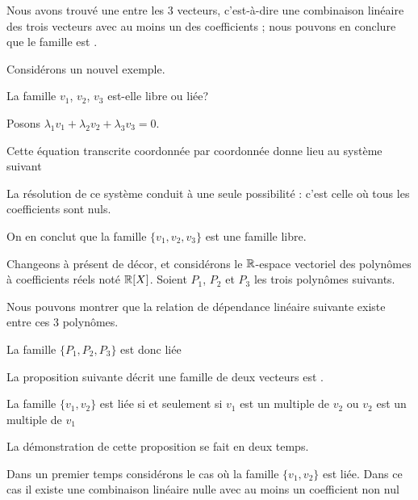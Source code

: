 \change
Nous avons trouvé une  entre les 3 vecteurs,
c'est-à-dire une combinaison linéaire  des trois vecteurs 
avec au moins un des coefficients  ;
nous pouvons en conclure que le famille est .


\diapo
Considérons un nouvel exemple.

\change
La famille $v_1$, $v_2$, $v_3$ est-elle libre ou liée?

\change
 Posons
$\lambda_1 v_1+ \lambda_2 v_2 + \lambda_3 v_3 = 0$.

\change
Cette équation transcrite coordonnée par coordonnée donne lieu au syst\`eme suivant

\change
La résolution de ce syst\`eme conduit à une seule possibilité : c'est celle où tous les coefficients sont nuls.

\change 
On en conclut que la famille $\{v_1, v_2, v_3\}$ est une famille libre.

% 
% 
% 



\diapo
Changeons à présent de décor, et considérons le $\mathbb{R}$-espace vectoriel des polynômes à coefficients réels noté $\mathbb{R}[X]$. Soient $P_1$, $P_2$ et $P_3$ les trois polynômes suivants.

\change
Nous pouvons montrer que la relation de dépendance linéaire suivante existe entre ces 3 polynômes.

\change
La famille $\{P_1, P_2, P_3\}$ est donc liée 

\diapo
La proposition suivante décrit  une famille de deux vecteurs  est .


La famille $\{ v_1, v_2\}$ est liée si
et seulement si $v_1$ est un multiple de $v_2$ ou 
$v_2$ est un multiple de $v_1$


La démonstration de cette proposition se fait en deux temps.

\change
Dans un premier temps considérons le cas où la famille $\{ v_1, v_2\}$ est liée. Dans ce cas il existe une combinaison linéaire nulle avec au moins un coefficient non nul

